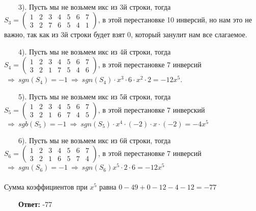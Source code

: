 \documentclass[a4paper, 12pt]{article}
\begin{document}
    \\
    \par \ \ \ \ 3). Пусть мы не возьмем икс из 3й строки, тогда $S_3 = \begin{pmatrix}1 & 2 & 3 & 4 & 5 & 6 & 7 \\ 3 & 2 & 7 & 6 & 5 & 4 & 1 \end{pmatrix}$, в этой перестановке 10 инверсий, но нам это не важно, так как из 3й строки будет взят 0, который занулит нам все слагаемое.
    \\
    \par \ \ \ \ 4). Пусть мы не возьмем икс из 4й строки, тогда $S_4 = \begin{pmatrix}1 & 2 & 3 & 4 & 5 & 6 & 7 \\ 3 & 2 & 1 & 7 & 5 & 4 & 6 \end{pmatrix}$, в этой перестановке 7 инверсий $\ \Rightarrow \ sgn (S_4) = -1 \ \Rightarrow \ sgn(S_4) \cdot x^3 \cdot 6 \cdot x^2 \cdot 2 = -12x^5$.
    \\
    \par \ \ \ \ 5). Пусть мы не возьмем икс из 5й строки, тогда $S_5 = \begin{pmatrix}1 & 2 & 3 & 4 & 5 & 6 & 7 \\ 3 & 2 & 1 & 6 & 7 & 4 & 5 \end{pmatrix}$, в этой перестановке 7 инверский $\ \Rightarrow \ sgb (S_5) = -1 \ \Rightarrow \ sgn(S_5) \cdot x^4 \cdot (-2) \cdot x \cdot (-2) = -4x^5$
    \\
    \par \ \ \ \ 6). Пусть мы не возьмем икс из 6й строки, тогда $S_6 = \begin{pmatrix}1 & 2 & 3 & 4 & 5 & 6 & 7 \\ 3 & 2 & 1 & 6 & 5 & 7 & 4 \end{pmatrix}$, в этой перестановке 7 инверсий $\ \Rightarrow \ sgn(S_6) = -1 \ \Rightarrow \ sgn(S_6) x^5 \cdot 2 \cdot 6 = -12x^5$
    \\
    \\ Сумма коэффициентов при $x^5$ равна $0 - 49 + 0 - 12 - 4 - 12 = -77$
    \\
    \par \ \ \ \ \textbf{Ответ: } -77
\end{document}

